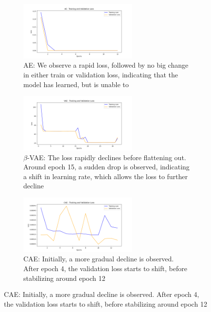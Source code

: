 \begin{figure}[!htbp]
  \centering
  \begin{subfigure}{\textwidth}
    \centering
    \includegraphics[width=0.65\textwidth]{figures/losses/ae.png}
    \caption{AE: We observe a rapid loss, followed by no big change in either train or validation loss, indicating that the model has learned, but is unable to }
  \end{subfigure}
  
  \vspace{0.5cm}
  
  \begin{subfigure}{\textwidth}
    \centering
    \includegraphics[width=0.65\textwidth]{figures/losses/vae.png}
    \caption{$\beta$-VAE: The loss rapidly declines before flattening out. Around epoch 15, a sudden drop is observed, indicating a shift in learning rate, which allows the loss to further decline}
  \end{subfigure}
  
  \vspace{0.5cm}
  
  \begin{subfigure}{\textwidth}
    \centering
    \includegraphics[width=0.65\textwidth]{figures/losses/cae.png}
    \caption{CAE: Initially, a more gradual decline is observed. After epoch 4, the validation loss starts to shift, before stabilizing around epoch 12}
  \end{subfigure}
  

\end{figure}
